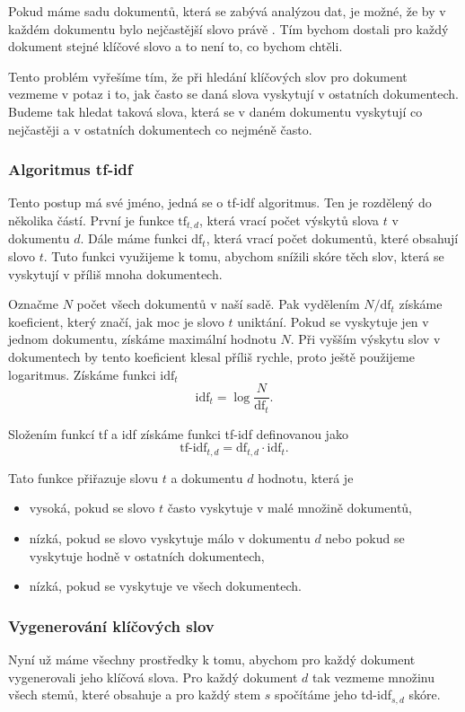 \documentclass[12pt]{article}
\newcommand{\sssection}[1]{\subsubsection{#1}}
\begin{document}
Pokud máme sadu dokumentů, která se zabývá analýzou dat, je možné, že by v každém dokumentu bylo nejčastější slovo právě . Tím bychom dostali pro každý dokument stejné klíčové slovo a to není to, co bychom chtěli. 

Tento problém vyřešíme tím, že při hledání klíčových slov pro dokument vezmeme v potaz i to, jak často se daná slova vyskytují v ostatních dokumentech. Budeme tak hledat taková slova, která se v daném dokumentu vyskytují co nejčastěji a v ostatních dokumentech co nejméně často. 


\subsubsection{Algoritmus tf-idf}
Tento postup má své jméno, jedná se o tf-idf algoritmus. Ten je rozdělený do několika částí. První je funkce $\mbox{tf}_{t,d}$, která vrací počet výskytů slova $t$ v dokumentu $d$. Dále máme funkci $\mbox{df}_t$, která vrací počet dokumentů, které obsahují slovo $t$. Tuto funkci využijeme k tomu, abychom snížili skóre těch slov, která se vyskytují v příliš mnoha dokumentech. 

Označme $N$ počet všech dokumentů v naší sadě. Pak vydělením $N/\mbox{df}_t$ získáme koeficient, který značí, jak moc je slovo $t$ uniktání. Pokud se vyskytuje jen v jednom dokumentu, získáme maximální hodnotu $N$. Při vyšším výskytu slov v dokumentech by tento koeficient klesal příliš rychle, proto ještě použijeme logaritmus. Získáme funkci $\mbox{idf}_t$
$$\mbox{idf}_t=\log\frac{N}{\mbox{df}_t}.$$

Složením funkcí tf a idf získáme funkci tf-idf definovanou jako
$$\mbox{tf-idf}_{t,d}=\mbox{df}_{t,d}\cdot\mbox{idf}_t.$$

Tato funkce přiřazuje slovu $t$ a dokumentu $d$ hodnotu, která je

\begin{itemize}
\item vysoká, pokud se slovo $t$ často vyskytuje v malé množině dokumentů,
\item nízká, pokud se slovo vyskytuje málo v dokumentu $d$ nebo pokud se vyskytuje hodně v ostatních dokumentech,
\item nízká, pokud se vyskytuje ve všech dokumentech. 
\end{itemize}

\sssection{Vygenerování klíčových slov}

Nyní už máme všechny prostředky k tomu, abychom pro každý dokument vygenerovali jeho klíčová slova. Pro každý dokument $d$ tak vezmeme množinu všech stemů, které obsahuje a pro každý stem $s$ spočítáme jeho td-idf$_{s,d}$ skóre. 
\end{document}
